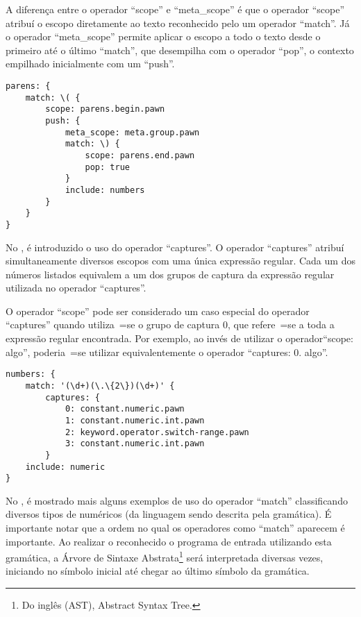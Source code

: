 A diferença entre o operador ``scope'' e
``meta\_scope'' é que o operador ``scope'' atribuí o escopo diretamente ao texto reconhecido pelo um operador ``match''.
Já o operador ``meta\_scope'' permite aplicar o escopo a todo o texto desde o primeiro até o último ``match'',
que desempilha com o operador ``pop'',
o contexto empilhado inicialmente com um ``push''.
\begin{lstlisting}[caption={Exemplo de Gramática -- Contextos},label={exemploDeGramaticaPawn2},style=yaml_style]
parens: {
    match: \( {
        scope: parens.begin.pawn
        push: {
            meta_scope: meta.group.pawn
            match: \) {
                scope: parens.end.pawn
                pop: true
            }
            include: numbers
        }
    }
}
\end{lstlisting}

No ,
é introduzido o uso do operador ``captures''.
O operador ``captures'' atribuí simultaneamente diversos escopos com uma única expressão regular.
Cada um dos números listados equivalem a um dos grupos de captura \cite{expressionGrammarsWithRegexLikeCaptures} da expressão regular utilizada no operador ``captures''.

O operador ``scope'' pode ser considerado um caso especial do operador ``captures'' quando utiliza~=se o grupo de captura 0,
que refere~=se a toda a expressão regular encontrada.
Por exemplo,
ao invés de utilizar o operador``scope:
algo'',
poderia~=se utilizar equivalentemente o operador ``captures:
0.
algo''.
\begin{lstlisting}[caption={Exemplo de Gramática -- Grupos de Captura},label={exemploDeGramaticaPawn3},style=yaml_style]
numbers: {
    match: '(\d+)(\.\{2\})(\d+)' {
        captures: {
            0: constant.numeric.pawn
            1: constant.numeric.int.pawn
            2: keyword.operator.switch-range.pawn
            3: constant.numeric.int.pawn
        }
    include: numeric
}
\end{lstlisting}

No ,
é mostrado mais alguns exemplos de uso do operador ``match'' classificando diversos tipos de numéricos (da linguagem sendo descrita pela gramática).
É importante notar que a ordem no qual os operadores como ``match'' aparecem é importante.
Ao realizar o reconhecido o programa de entrada utilizando esta gramática,
a Árvore de Sintaxe Abstrata\footnote{%
Do inglês (AST), Abstract Syntax Tree.
} \cite{ahoCompilerDragonBook} será interpretada diversas vezes,
iniciando no símbolo inicial até chegar ao último símbolo da gramática.

